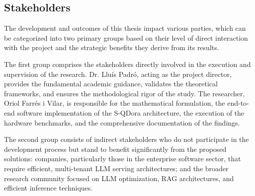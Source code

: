 \subsection{Stakeholders}
\label{subsec:stakeholders}

The development and outcomes of this thesis impact various parties, which can be categorized into two primary groups based on their level of direct interaction with the project and the strategic benefits they derive from its results.

The first group comprises the stakeholders directly involved in the execution and supervision of the research. Dr. Lluís Padró, acting as the project director, provides the fundamental academic guidance, validates the theoretical frameworks, and ensures the methodological rigor of the study. The researcher, Oriol Farrés i Vilar, is responsible for the mathematical formulation, the end-to-end software implementation of the S-QDora architecture, the execution of the hardware benchmarks, and the comprehensive documentation of the findings.

The second group consists of indirect stakeholders who do not participate in the development process but stand to benefit significantly from the proposed solutions: companies, particularly those in the enterprise software sector, that require efficient, multi-tenant LLM serving architectures; and the broader research community focused on LLM optimization, RAG architectures, and efficient inference techniques.

